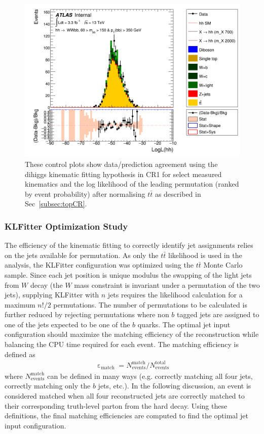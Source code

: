 \begin{figure}[!hb]
\begin{center}
                \includegraphics[width=.47\textwidth]{figures/kinFit_appendix/bbpt350_NF1190/C_mBBcr_opt2000_bbpt350_LogLikelihood_dihiggs}
	\caption{These control plots show data/prediction agreement using the dihiggs kinematic fitting hypothesis in CR1 for select measured kinematics and the log likelihood of the leading permutation (ranked by event probability) after normalising $t\bar{t}$ as described in Sec~\ref{subsec:topCR}.}
	\label{fig:klfitter_control_plots_hh_bbpt350_nf1190}
	\end{center}    
	\end{figure}


\subsubsection{KLFitter Optimization Study}
\label{sec:KLopt}
The efficiency of the kinematic fitting to correctly identify jet assignments relies on the jets available for permutation. As only the $t\bar{t}$ likelihood is used in the analysis, the KLFitter configuration was optimized using the $t\bar{t}$ Monte Carlo sample. Since each jet position is unique modulus the swapping of the light jets from $W$ decay (the $W$ mass constraint is invariant under a permutation of the two jets), supplying KLFitter with $n$ jets requires the likelihood calculation for a maximum $n!/2$ permutations. The number of permutations to be calculated is further reduced by rejecting permutations where non $b$ tagged jets are assigned to one of the jets expected to be one of the $b$ quarks. The optimal jet input configuration should maximize the matching efficiency of the reconstruction while balancing the CPU time required for each event. 
The matching efficiency is defined as
\begin{eqnarray}
\upepsilon_{\text{match}}=N_{\text{events}}^{\text{match}}/N_{\text{events}}^{\text{total}}
\label{eq:matchEff}
\end{eqnarray}
where $N_{\text{events}}^{\text{match}}$ can be defined in many ways (e.g. correctly matching all four jets, correctly matching only the $b$ jets, etc.). In the following discussion, an event is considered matched when all four reconstructed jets are correctly matched to their corresponding truth-level parton from the hard decay. Using these definitions, the final matching efficiencies are computed to find the optimal jet input configuration.


